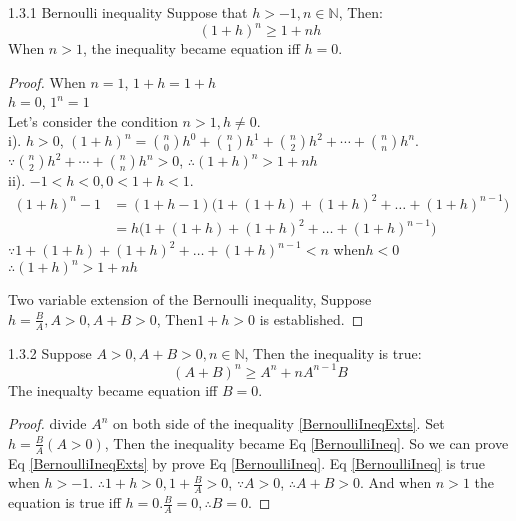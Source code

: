 \begin{proposition}
{1.3.1 Bernoulli inequality}
 Suppose that $ h>-1, n\in\mathbb{N} $, Then:
	\begin{equation}\label{BernoulliIneq}
		(1+h)^n\ge1+nh
 	\end{equation}
 	When $ n>1 $, the inequality became equation iff $ h=0 $.\\
\end{proposition}
 	
\begin{proof}
 	When $ n=1 $, $ 1+h=1+h $\\
 	$ h=0 $, $ 1^n=1 $\\
 	Let's consider the condition $ n>1, h\ne 0 $.\\
 	i). $ h>0 $, $ (1+h)^n = \binom{n}{0}h^0+\binom{n}{1}h^1+\binom{n}{2}h^2+\cdots + \binom{n}{n}h^n$.\\
 	$ \because \binom{n}{2}h^2+\cdots + \binom{n}{n}h^n >0 $, $ \therefore (1+h)^n > 1+nh $\\
 	ii). $ -1<h<0, 0<1+h<1 $.
 	\begin{align*}
 		(1+h)^n-1 &=(1+h-1)\Big(1+(1+h)+(1+h)^2+\dots+(1+h)^{n-1}\Big)\\
 		&=h\Big(1+(1+h)+(1+h)^2+\dots+(1+h)^{n-1}\Big)
 	\end{align*}
 	$ \because 1+(1+h)+(1+h)^2+\dots+(1+h)^{n-1} < n $ when$ h<0 $\\
 	$ \therefore (1+h)^n > 1+nh $

 	Two variable extension of the Bernoulli inequality, Suppose
 	$ h = \frac{B}{A}, A>0, A+B>0 $, Then$ 1+h>0 $ is established.
\end{proof}	

\begin{proposition} 	
 	{1.3.2 }Suppose $ A>0, A+B>0, n\in\mathbb{N} $, Then the inequality is true:
 	\begin{equation}\label{BernoulliIneqExts}
 		(A+B)^n\ge A^n+nA^{n-1}B
 	\end{equation}
 	The inequalty became equation iff $ B=0 $.
\end{proposition}	

\begin{proof}	
 	divide $ A^n $ on both side of the inequality \ref{BernoulliIneqExts}. Set$ h=\frac{B}{A} (A>0) $, Then the inequality became Eq \ref{BernoulliIneq}.
 	So we can prove Eq \ref{BernoulliIneqExts} by prove Eq \ref{BernoulliIneq}.
 	Eq \ref{BernoulliIneq} is true when $ h>-1 $. $ \therefore 1+h>0, 1+\frac{B}{A}>0 $, $ \because A>0 $, $ \therefore A+B>0 $. And when $ n>1 $ the equation is true iff $h=0 $.$ \frac{B}{A}=0,\therefore B=0 $.
\end{proof}	 

